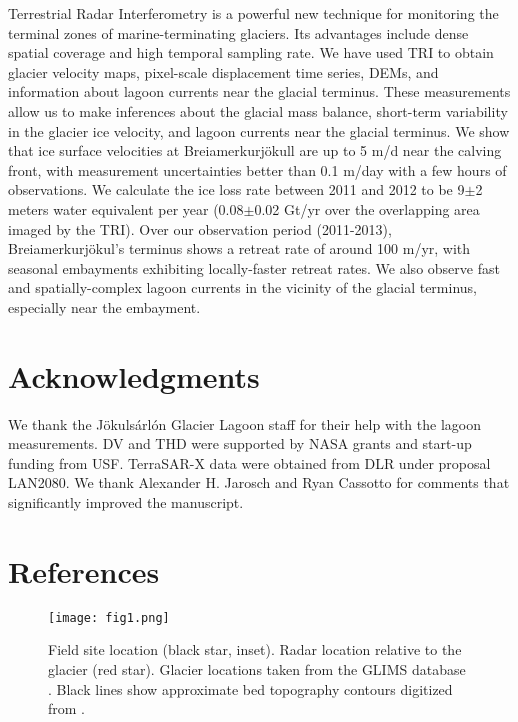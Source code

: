 Terrestrial Radar Interferometry is a powerful new technique for monitoring the terminal zones of marine-terminating glaciers. Its advantages include dense spatial coverage and high temporal sampling rate. We have used TRI to obtain glacier velocity maps, pixel-scale displacement time series, DEMs, and information about lagoon currents near the glacial terminus. These measurements allow us to make inferences about the glacial mass balance, short-term variability in the glacier ice velocity, and lagoon currents near the glacial terminus. We show that ice surface velocities at Brei{\dh}amerkurjökull are up to 5 m/d near the calving front, with measurement uncertainties better than 0.1 m/day  with a few hours of observations. We calculate the ice loss rate between 2011 and 2012 to be 9$\pm$2 meters water equivalent per year (0.08$\pm$0.02 Gt/yr over the overlapping area imaged by the TRI). Over our observation period (2011-2013), Brei{\dh}amerkurjökul's terminus shows a retreat rate of around 100 m/yr, with seasonal embayments exhibiting locally-faster retreat rates. We also observe fast and spatially-complex lagoon currents in the vicinity of the glacial terminus, especially near the embayment.

\section{Acknowledgments}
We thank the Jökulsárlón Glacier Lagoon staff for their help with the lagoon measurements. DV and THD were supported by NASA grants and start-up funding from USF. TerraSAR-X data were obtained from DLR under proposal LAN2080. We thank Alexander H. Jarosch and Ryan Cassotto for comments that significantly improved the manuscript.



\section{References}


\newpage

\begin{figure*}
\centering
\texttt{[image: fig1.png]}
\caption[Field site location (black star, inset).]{Field site location (black star, inset). Radar location relative to the glacier (red star). Glacier locations taken from the GLIMS database \citep{sigurdhsson2005glims,raup2007glims}. Black lines show approximate bed topography contours digitized from \citet{bjornsson2001jokulsarlon}.}
\label{fig:sitelocation}
\end{figure*}

